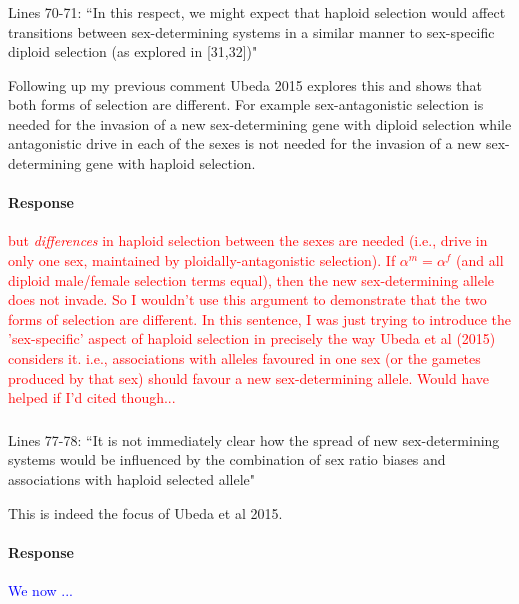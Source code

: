 \documentclass[10pt,letterpaper]{article}
\begin{document}
\noindent\subsubsection{}
Lines 70-71: ``In this respect, we might expect that haploid selection would affect transitions between sex-determining systems in a similar manner to sex-specific diploid selection (as explored in [31,32])" 

Following up my previous comment Ubeda 2015 explores this and shows that both forms of selection are different. For example sex-antagonistic selection is needed for the invasion of a new sex-determining gene with diploid selection while antagonistic drive in each of the sexes is not needed for the invasion of a new sex-determining gene with haploid selection.

\noindent\paragraph{Response}
\textcolor{red}{but \textit{differences} in haploid selection between the sexes are needed (i.e., drive in only one sex, maintained by ploidally-antagonistic selection). If $\alpha^{m}=\alpha^{f}$ (and all diploid male/female selection terms equal), then the new sex-determining allele does not invade. So I wouldn't use this argument to demonstrate that the two forms of selection are different. 
In this sentence, I was just trying to introduce the 'sex-specific' aspect of haploid selection in precisely the way Ubeda et al (2015) considers it. i.e., associations with alleles favoured in one sex (or the gametes produced by that sex) should favour a new sex-determining allele. Would have helped if I'd cited though... }

\noindent\subsubsection{}
Lines 77-78: ``It is not immediately clear how the spread of new sex-determining systems would be influenced by the combination of sex ratio biases and associations with haploid selected allele"

This is indeed the focus of Ubeda et al 2015.

\noindent\paragraph{Response}
\textcolor{blue}{We now ...}
\\
\end{document}
